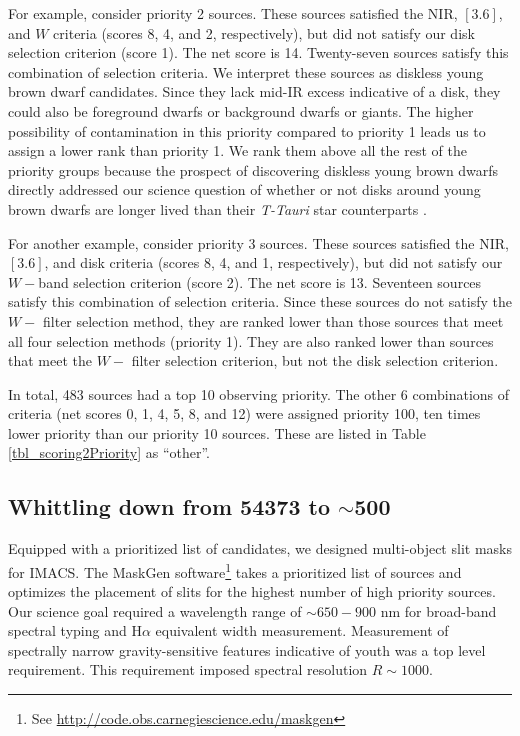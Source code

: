 For example, consider priority 2 sources.  These sources satisfied the NIR, $[3.6]$, and $W$ criteria (scores 8, 4, and 2, respectively), but did not satisfy our disk selection criterion (score 1).  The net score is 14.  Twenty-seven sources satisfy this combination of selection criteria.  We interpret these sources as diskless young brown dwarf candidates.  Since they lack mid-IR excess indicative of a disk, they could also be foreground dwarfs or background dwarfs or giants.  The higher possibility of contamination in this priority compared to priority 1 leads us to assign a lower rank than priority 1.  We rank them above all the rest of the priority groups because the prospect of discovering diskless young brown dwarfs directly addressed our science question of whether or not disks around young brown dwarfs are longer lived than their \emph{T-Tauri} star counterparts \citep{2008ApJ...681.1584R}.  

For another example, consider priority 3 sources.  These sources satisfied the NIR, $[3.6]$, and disk criteria (scores 8, 4, and 1, respectively), but did not satisfy our $W-$band selection criterion (score 2).  The net score is 13.  Seventeen sources satisfy this combination of selection criteria.  Since these sources do not satisfy the $W-$ filter selection method, they are ranked lower than those sources that meet all four selection methods (priority 1).  They are also ranked lower than sources that meet the $W-$ filter selection criterion, but not the disk selection criterion.

In total, 483 sources had a top 10 observing priority.  The other 6 combinations of criteria (net scores 0, 1, 4, 5, 8, and 12) were assigned priority 100, ten times lower priority than our priority 10 sources.  These are listed in Table \ref{tbl_scoring2Priority} as ``other''.



\subsection{Whittling down from 54373 to $\sim$500}
Equipped with a prioritized list of candidates, we designed multi-object slit masks for IMACS.  The MaskGen software\footnote{See \url{ http://code.obs.carnegiescience.edu/maskgen}} takes a prioritized list of sources and optimizes the placement of slits for the highest number of high priority sources.  Our science goal required a wavelength range of $\sim 650-900$ nm for broad-band spectral typing and H$\alpha$ equivalent width measurement.  Measurement of spectrally narrow gravity-sensitive features indicative of youth \citep{1999ApJ...525..466L,2007AJ....134.2398C,2009AJ....137.3345C} was a top level requirement.  This requirement imposed spectral resolution $R\sim1000$.

